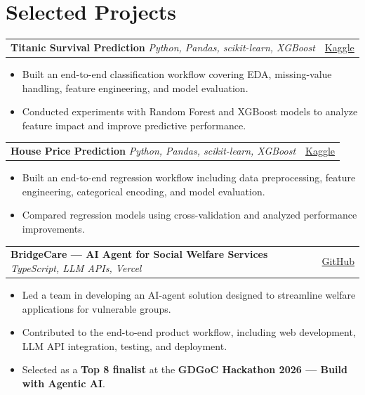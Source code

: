 \documentclass[11pt,a4paper]{article}
\makeatletter
\newcommand{\projectHeading}[3]{
  \begin{tabularx}{\textwidth}{
    @{}X>{\raggedleft\arraybackslash}p{0.25\textwidth}@{}
  }
    \textbf{#1} \enspace\textbar{}\enspace \small\textit{#2} & \small #3
  \end{tabularx}
  \vspace{-2pt}
}
\makeatother
\begin{document}
\section{Selected Projects}



\projectHeading
  {Titanic Survival Prediction}
  {Python, Pandas, scikit-learn, XGBoost}
  {\href{https://www.kaggle.com/shuminghao}{Kaggle}}

\begin{itemize}
  \item Built an end-to-end classification workflow covering EDA, missing-value handling, feature engineering, and model evaluation.
  \item Conducted experiments with Random Forest and XGBoost models to analyze feature impact and improve predictive performance.
\end{itemize}



\projectHeading
  {House Price Prediction}
  {Python, Pandas, scikit-learn, XGBoost}
  {\href{https://www.kaggle.com/shuminghao}{Kaggle}}

\begin{itemize}
  \item Built an end-to-end regression workflow including data preprocessing, feature engineering, categorical encoding, and model evaluation.
  \item Compared regression models using cross-validation and analyzed performance improvements.
\end{itemize}



\projectHeading
  {BridgeCare --- AI Agent for Social Welfare Services}
  {TypeScript, LLM APIs, Vercel}
  {\href{https://github.com/xinyunfan2-dev/BridgeCare-Team18-Gr}{GitHub}}

\begin{itemize}
  \item Led a team in developing an AI-agent solution designed to streamline welfare applications for vulnerable groups.
  \item Contributed to the end-to-end product workflow, including web development, LLM API integration, testing, and deployment.
  \item Selected as a \textbf{Top 8 finalist} at the \textbf{GDGoC Hackathon 2026 --- Build with Agentic AI}.
\end{itemize}
\end{document}
